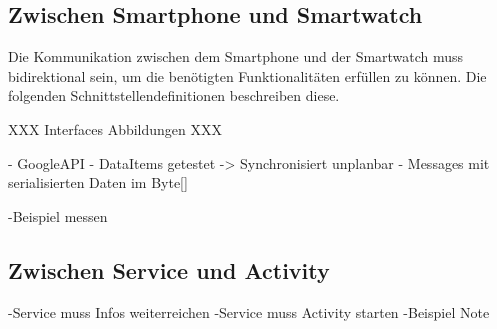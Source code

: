 \subsection{Zwischen Smartphone und Smartwatch}
Die Kommunikation zwischen dem Smartphone und der Smartwatch muss bidirektional sein, um die benötigten Funktionalitäten erfüllen zu können. Die folgenden Schnittstellendefinitionen beschreiben diese.

XXX Interfaces Abbildungen XXX


- GoogleAPI
	- DataItems getestet -> Synchronisiert  unplanbar
	- Messages mit serialisierten Daten im Byte[]

-Beispiel messen

\subsection{Zwischen Service und Activity}
-Service muss Infos weiterreichen
-Service muss Activity starten
-Beispiel Note

